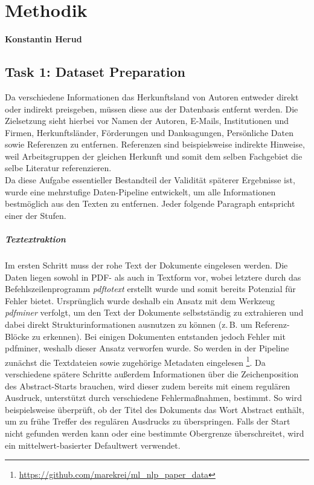 \documentclass[bachelor,german]{info1thesis}
\begin{document}
\chapter{Methodik}
\textbf{Konstantin Herud} \\

\section{Task 1: Dataset Preparation}

Da verschiedene Informationen das Herkunftsland von Autoren entweder direkt oder indirekt preisgeben, müssen diese aus der Datenbasis entfernt werden. Die Zielsetzung sieht hierbei vor
Namen der Autoren,
E-Mails,
Institutionen und Firmen,
Herkunftsländer,
Förderungen und Danksagungen,
Persönliche Daten
sowie Referenzen
zu entfernen.
Referenzen sind beispielsweise indirekte Hinweise, weil Arbeitsgruppen der gleichen Herkunft und somit dem selben Fachgebiet die selbe Literatur referenzieren. \\
Da diese Aufgabe essentieller Bestandteil der Validität späterer Ergebnisse ist, wurde eine mehrstufige Daten-Pipeline entwickelt, um alle Informationen bestmöglich aus den Texten zu entfernen. Jeder folgende Paragraph entspricht einer der Stufen.

\paragraph{Textextraktion} Im ersten Schritt muss der rohe Text der Dokumente eingelesen werden. Die Daten liegen sowohl in PDF- als auch in Textform vor, wobei letztere durch das Befehlszeilenprogramm \textit{pdftotext} erstellt wurde und somit bereits Potenzial für Fehler bietet. Ursprünglich wurde deshalb ein Ansatz mit dem Werkzeug \textit{pdfminer} verfolgt, um den Text der Dokumente selbstständig zu extrahieren und dabei direkt Strukturinformationen ausnutzen zu können (z.\,B. um Referenz-Blöcke zu erkennen). Bei einigen Dokumenten entstanden jedoch Fehler mit pdfminer, weshalb dieser Ansatz verworfen wurde. So werden in der Pipeline zunächst die Textdateien sowie zugehörige Metadaten eingelesen \footnote{\url{https://github.com/marekrei/ml_nlp_paper_data}}. Da verschiedene spätere Schritte außerdem Informationen über die Zeichenposition des Abstract-Starts brauchen, wird dieser zudem bereits mit einem regulären Ausdruck, unterstützt durch verschiedene Fehlermaßnahmen, bestimmt. So wird beispielsweise überprüft, ob der Titel des Dokuments das Wort Abstract enthält, um zu frühe Treffer des regulären Ausdrucks zu überspringen. Falls der Start nicht gefunden werden kann oder eine bestimmte Obergrenze überschreitet, wird ein mittelwert-basierter Defaultwert verwendet.
\end{document}
